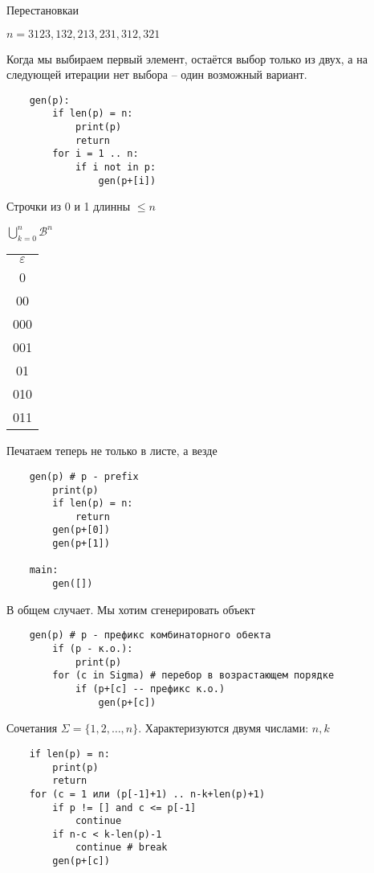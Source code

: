 \documentclass{book}
\theoremstyle{definition}
\begin{document}
Перестановкаи

$n=3 123, 132, 213, 231, 312, 321$

Когда мы выбираем первый элемент, остаётся выбор только из двух, а на следующей итерации нет выбора -- один возможный вариант.

\begin{verbatim}
    gen(p):
        if len(p) = n:
            print(p)
            return
        for i = 1 .. n:
            if i not in p:
                gen(p+[i])
\end{verbatim}

Строчки из 0 и 1 длинны $\leqslant n$

$\bigcup\limits_{k=0}^{n} \mathscr{B}^n $ 

\begin{tabular}{c}
    $\varepsilon$\\
    0\\00\\000\\001\\01\\010\\011\\
\end{tabular}

Печатаем теперь не только в листе, а везде
  
\begin{verbatim}
    gen(p) # p - prefix
        print(p)
        if len(p) = n:
            return
        gen(p+[0])
        gen(p+[1])

    main:
        gen([])
\end{verbatim}

В общем случает. Мы хотим сгенерировать объект

\begin{verbatim}
    gen(p) # p - префикс комбинаторного обекта
        if (p - к.о.):
            print(p)
        for (c in Sigma) # перебор в возрастающем порядке
            if (p+[c] -- префикс к.о.)
                gen(p+[c])
\end{verbatim}

Сочетания $\Sigma = \{1, 2, \ldots, n\}$. Характеризуются двумя числами: $n, k$

 \begin{verbatim}
    if len(p) = n:
        print(p)
        return
    for (c = 1 или (p[-1]+1) .. n-k+len(p)+1)
        if p != [] and c <= p[-1]
            continue
        if n-c < k-len(p)-1
            continue # break
        gen(p+[c])
\end{verbatim}
\end{document}

